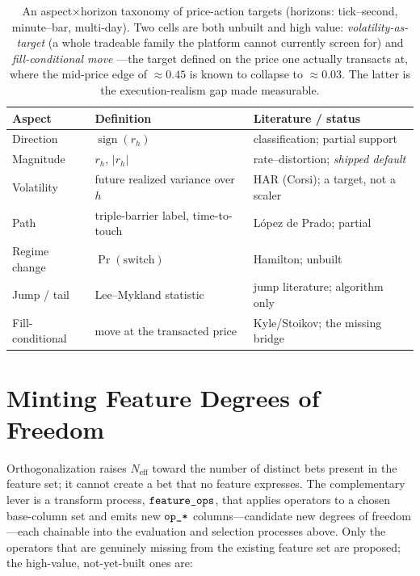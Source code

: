 \documentclass[11pt,a4paper]{article}
\theoremstyle{definition}
\theoremstyle{plain}
\newcommand{\sgn}{\operatorname{sign}}
\newcommand{\Neff}{N_{\mathrm{eff}}}
\newcommand{\code}[1]{\texttt{\detokenize{#1}}}
\begin{document}
\begin{table}[h]
\centering
\renewcommand{\arraystretch}{1.3}
\setlength{\tabcolsep}{6pt}
\begin{tabular}{>{\raggedright\arraybackslash}p{4.3cm}
                >{\raggedright\arraybackslash}p{4.6cm}
                >{\raggedright\arraybackslash}p{4.9cm}}
\hline
\textbf{Aspect} & \textbf{Definition} & \textbf{Literature / status} \\
\hline
Direction        & $\sgn(r_h)$                                  & classification; partial support \\
Magnitude        & $r_h$, $|r_h|$                               & rate--distortion; \emph{shipped default} \\
Volatility       & future realized variance over $h$            & HAR (Corsi); a target, not a scaler \\
Path             & triple-barrier label, time-to-touch          & L\'opez de Prado; partial \\
Regime change    & $\Pr(\text{switch})$                         & Hamilton; unbuilt \\
Jump / tail      & Lee--Mykland statistic                       & jump literature; algorithm only \\
Fill-conditional & move at the transacted price                 & Kyle/Stoikov; the missing bridge \\
\hline
\end{tabular}
\caption{An aspect$\times$horizon taxonomy of price-action targets (horizons: tick--second,
minute--bar, multi-day). Two cells are both unbuilt and high value: \emph{volatility-as-target}
(a whole tradeable family the platform cannot currently screen for) and \emph{fill-conditional move}
---the target defined on the price one actually transacts at, where the mid-price edge of
$\approx 0.45$ is known to collapse to $\approx 0.03$. The latter is the execution-realism gap made
measurable.}
\label{tab:targets}
\end{table}

\section{Minting Feature Degrees of Freedom}
\label{sec:ops}

Orthogonalization raises $\Neff$ toward the number of distinct bets present in the feature set; it
cannot create a bet that no feature expresses. The complementary lever is a transform process,
$\code{feature_ops}$, that applies operators to a chosen base-column set and emits new
$\code{op_*}$ columns---candidate new degrees of freedom---each chainable into the evaluation and
selection processes above. Only the operators that are genuinely missing from the existing feature
set are proposed; the high-value, not-yet-built ones are:
\end{document}
